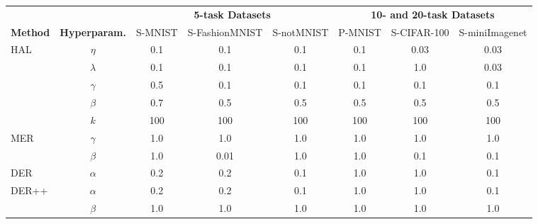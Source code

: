 
\begin{tabular}{l c c c c c c c}
	\toprule
	& & \multicolumn{3}{c}{{\bf 5-task Datasets}} & \multicolumn{3}{c}{{\bf 10- and 20-task Datasets}} \\
	\cmidrule(lr){3-5} \cmidrule(lr){6-8}
	{\bf Method} & {\bf Hyperparam.}  & S-MNIST & S-FashionMNIST & S-notMNIST & P-MNIST & S-CIFAR-100 & S-miniImagenet \\
	\midrule
	\multirow{5}{*}{HAL} & $\eta$ & 0.1 & 0.1 & 0.1 & 0.1 & 0.03 & 0.03 \\
	& $\lambda$  & 0.1 & 0.1 & 0.1 & 0.1 & 1.0 & 0.03 \\
	& $\gamma$ & 0.5 & 0.1 & 0.1 & 0.1 & 0.1 & 0.1 \\
	& $\beta$ & 0.7 & 0.5 & 0.5 & 0.5 & 0.5 & 0.5 \\
	& $k$ & 100 & 100 & 100 & 100 & 100 & 100 \\
	\midrule 
	\multirow{2}{*}{MER} & $\gamma$ & 1.0 & 1.0 & 1.0 & 1.0 & 1.0 & 1.0  \\ 
	& $\beta$  & 1.0 & 0.01 & 1.0 & 1.0 & 0.1 & 0.1 \\
	\midrule 
	\multirow{1}{*}{DER} & $\alpha$ & 0.2 & 0.2 & 0.1 & 1.0 & 1.0 & 0.1 \\ 
	\midrule 
	\multirow{2}{*}{DER++} & $\alpha$ & 0.2 & 0.2 & 0.1 & 1.0 & 1.0 & 0.1 \\ 
	& $\beta$ & 1.0 & 1.0 & 1.0 & 1.0 & 1.0 & 1.0 \\
	\bottomrule
\end{tabular}